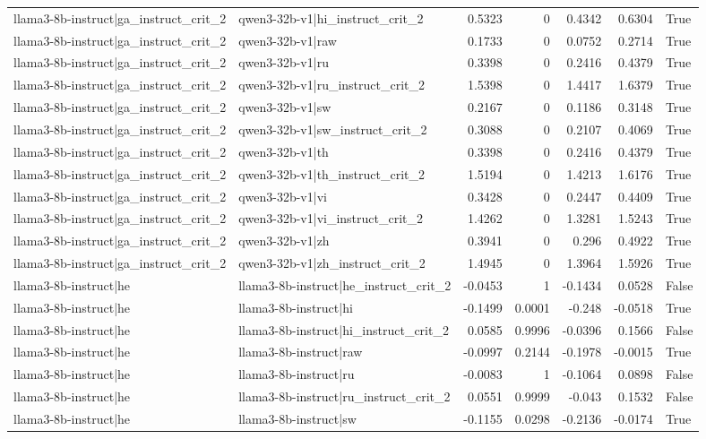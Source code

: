 \begin{table}
\begin{tabular}{l l r r r r l}
llama3-8b-instruct|ga_instruct_crit_2 & qwen3-32b-v1|hi_instruct_crit_2 & 0.5323 & 0 & 0.4342 & 0.6304 & True \\
llama3-8b-instruct|ga_instruct_crit_2 & qwen3-32b-v1|raw & 0.1733 & 0 & 0.0752 & 0.2714 & True \\
llama3-8b-instruct|ga_instruct_crit_2 & qwen3-32b-v1|ru & 0.3398 & 0 & 0.2416 & 0.4379 & True \\
llama3-8b-instruct|ga_instruct_crit_2 & qwen3-32b-v1|ru_instruct_crit_2 & 1.5398 & 0 & 1.4417 & 1.6379 & True \\
llama3-8b-instruct|ga_instruct_crit_2 & qwen3-32b-v1|sw & 0.2167 & 0 & 0.1186 & 0.3148 & True \\
llama3-8b-instruct|ga_instruct_crit_2 & qwen3-32b-v1|sw_instruct_crit_2 & 0.3088 & 0 & 0.2107 & 0.4069 & True \\
llama3-8b-instruct|ga_instruct_crit_2 & qwen3-32b-v1|th & 0.3398 & 0 & 0.2416 & 0.4379 & True \\
llama3-8b-instruct|ga_instruct_crit_2 & qwen3-32b-v1|th_instruct_crit_2 & 1.5194 & 0 & 1.4213 & 1.6176 & True \\
llama3-8b-instruct|ga_instruct_crit_2 & qwen3-32b-v1|vi & 0.3428 & 0 & 0.2447 & 0.4409 & True \\
llama3-8b-instruct|ga_instruct_crit_2 & qwen3-32b-v1|vi_instruct_crit_2 & 1.4262 & 0 & 1.3281 & 1.5243 & True \\
llama3-8b-instruct|ga_instruct_crit_2 & qwen3-32b-v1|zh & 0.3941 & 0 & 0.296 & 0.4922 & True \\
llama3-8b-instruct|ga_instruct_crit_2 & qwen3-32b-v1|zh_instruct_crit_2 & 1.4945 & 0 & 1.3964 & 1.5926 & True \\
llama3-8b-instruct|he & llama3-8b-instruct|he_instruct_crit_2 & -0.0453 & 1 & -0.1434 & 0.0528 & False \\
llama3-8b-instruct|he & llama3-8b-instruct|hi & -0.1499 & 0.0001 & -0.248 & -0.0518 & True \\
llama3-8b-instruct|he & llama3-8b-instruct|hi_instruct_crit_2 & 0.0585 & 0.9996 & -0.0396 & 0.1566 & False \\
llama3-8b-instruct|he & llama3-8b-instruct|raw & -0.0997 & 0.2144 & -0.1978 & -0.0015 & True \\
llama3-8b-instruct|he & llama3-8b-instruct|ru & -0.0083 & 1 & -0.1064 & 0.0898 & False \\
llama3-8b-instruct|he & llama3-8b-instruct|ru_instruct_crit_2 & 0.0551 & 0.9999 & -0.043 & 0.1532 & False \\
llama3-8b-instruct|he & llama3-8b-instruct|sw & -0.1155 & 0.0298 & -0.2136 & -0.0174 & True \\

\end{tabular}
\end{table}
